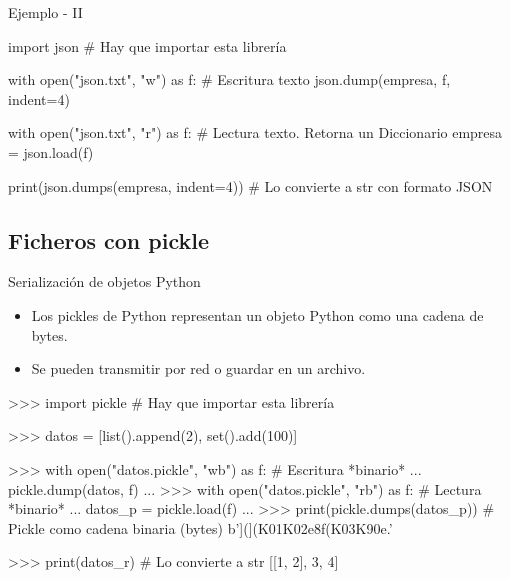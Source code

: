 \documentclass[10pt, envcountsect , spanish]{beamer}
\begin{document}
\begin{frame}[fragile]{Ejemplo - II} 
\footnotesize
\begin{pyconsole}[][frame=single, fontsize=\scriptsize]
import json   # Hay que importar esta librería

with open("json.txt", "w") as f:       # Escritura texto
  json.dump(empresa, f, indent=4)

with open("json.txt", "r") as f:       # Lectura texto. Retorna un Diccionario
  empresa = json.load(f)

print(json.dumps(empresa, indent=4)) # Lo convierte a str con formato JSON

\end{pyconsole}
\end{frame}





\subsection{Ficheros  con pickle}


\begin{frame}[fragile]{Serialización de objetos Python} 
\begin{itemize}
\item Los pickles de Python representan un objeto Python como una cadena de bytes.
\item Se pueden transmitir por red o guardar en un archivo.
\end{itemize}


\footnotesize
\begin{pyverbatim}[][frame=single]%

>>> import pickle   # Hay que importar esta librería

>>> datos = [list().append(2), set().add(100)]

>>> with open("datos.pickle", "wb") as f:         # Escritura *binario*
...  pickle.dump(datos, f)
...
>>> with open("datos.pickle", "rb") as f:         # Lectura *binario*
...  datos_p = pickle.load(f)
...
>>> print(pickle.dumps(datos_p)) # Pickle como cadena binaria (bytes)
b'](](K\x01K\x02e\x8f(K\x03K\x90e.'

>>> print(datos_r) # Lo convierte a str 
[[1, 2], {3, 4}]
\end{pyverbatim}
\end{frame}
\end{document}
